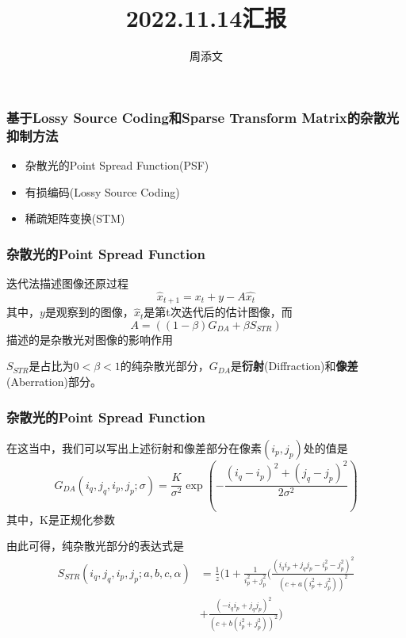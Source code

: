 \documentclass{beamer}
\title[2022.11.14日汇报] %
{2022.11.14汇报}
\author[周添文] %
{周添文\inst{} }
\institute[] %
{
  \inst{}%
  数学科学学院\\
  北京师范大学\\
}
\date[2022.11.14] %
\begin{document}
\frame{\titlepage}
\begin{frame}
\frametitle{基于Lossy Source Coding和Sparse Transform Matrix的杂散光抑制方法}

\begin{itemize}
\item 杂散光的Point Spread Function(PSF)
\item 有损编码(Lossy Source Coding)
\item 稀疏矩阵变换(STM)
\end{itemize}




\end{frame}
\begin{frame}
\frametitle{杂散光的Point Spread Function}
迭代法描述图像还原过程
\begin{equation}
\hat{x}_{t+1}=\hat{x_t}+y-A\hat{x_t}
\end{equation}\pause
其中，$y$是观察到的图像，$\hat{x}_{t}$是第t次迭代后的估计图像，而
\begin{equation}
A=((1-\beta)G_{DA}+\beta S_{STR})
\end{equation}
描述的是杂散光对图像的影响作用\pause

$S_{STR}$是占比为$0<\beta<1$的纯杂散光部分，$G_{DA}$是\textbf{衍射}(Diffraction)和\textbf{像差}(Aberration)部分。

\end{frame}
\begin{frame}
\frametitle{杂散光的Point Spread Function}
在这当中，我们可以写出上述衍射和像差部分在像素$(i_p,j_p)$处的值是
\begin{equation}
G_{DA}(i_q,j_q,i_p,j_p;\sigma)=\frac{K}{\sigma ^2}\exp(-\frac{(i_q-i_p)^2+(j_q-j_p)^2}{2\sigma ^2})
\end{equation}
其中，K是正规化参数\pause

由此可得，纯杂散光部分的表达式是
\begin{align*}
S_{STR}(i_q,j_q,i_p,j_p;a,b,c,\alpha)&=
\frac{1}{z}(1+\frac{1}{i_p^2+j_p^2}(\frac{(i_qi_p+j_qj_p-i_p^2-j_p^2)^2}{(c+a(i_p^2+j_p^2))^2}\\&+\frac{(-i_qi_p+j_qj_p)^2}{(c+b(i_p^2+j_p^2))^2})
\end{align*}

\end{frame}
\end{document}

